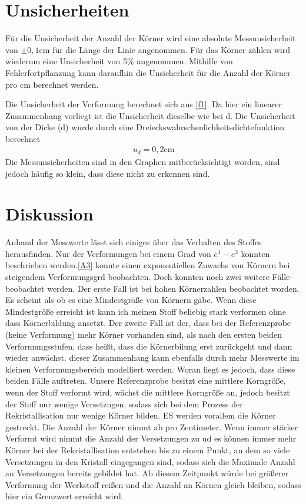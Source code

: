 \documentclass[
	a4paper,
	12pt,
	pagesize,
	ngerman
]{scrartcl}
\begin{document}
\section{Unsicherheiten}
Für die Unsicherheit der Anzahl der Körner wird eine absolute Messunsicherheit von $\pm 0,1$cm für die Länge der Linie angenommen. Für das Körner zählen wird wiederum eine Unsicherheit von 5\% angenommen. Mithilfe von Fehlerfortpflanzung kann daraufhin die Unsicherheit für die Anzahl der Körner pro cm berechnet werden.

Die Unsicherheit der Verformung berechnet sich aus \cref{f1}.
Da hier ein linearer Zusammenhang vorliegt ist die Unsicherheit dieselbe wie bei d. Die Unsicherheit von der Dicke (d) wurde durch eine Dreieckswahrschenlichkeitsdichtefunktion berechnet 
\begin{align*}
    u_d = 0,2\text{cm}
\end{align*}
Die Messunsicherheiten sind in den Graphen mitberücksichtigt worden, sind jedoch häufig so klein, dass diese nicht zu erkennen sind.


\section{Diskussion}
Anhand der Messwerte lässt sich einiges über das Verhalten des Stoffes herausfinden. Nur der Verformungen bei einem Grad von $e^1-e^3$ konnten beschrieben werden.\cref{A3} konnte einen exponentiellen Zuwachs von Körnern bei steigendem Verformungsgrd beobachten. Doch konnten noch zwei weitere Fälle beobachtet werden. Der erste Fall ist bei hohen Körnerzahlen beobachtet worden. Es scheint als ob es eine Mindestgröße von Körnern gäbe. Wenn diese Mindestgröße erreicht ist kann ich meinen Stoff beliebig stark verformen ohne dass Körnerbildung ansetzt. Der zweite Fall ist der, dass bei der Referenzprobe (keine Verformung) mehr Körner vorhanden sind, als nach den ersten beiden Verformungsstufen, dass heißt, dass die Körnerbilung erst zurückgeht und dann wieder anwächst. dieser Zusammenhang kann ebenfalls durch mehr Messwerte im kleinen Verformungsbereich modelliert werden. Woran liegt es jedoch, dass diese beiden Fälle auftreten. Unsere Referenzprobe besitzt eine mittlere Korngröße, wenn der Stoff verformt wird, wächst die mittlere Korngröße an, jedoch besitzt der Stoff nur wenige Versetzngen, sodass sich bei dem Prozess der Rekristallisation nur wenige Körner bilden. ES werden vorallem die Körner gestreckt. Die Anzahl der Körner nimmt ab pro Zentimeter. Wenn immer stärker Verformt wird nimmt die Anzahl der Versetzungen zu ud es können immer mehr Körner bei der Rekristallisation entstehen bis zu einem Punkt, an dem so viele Versetzungen in den Kristall eingegangen sind, sodass sich die Maximale Anzahl an Versetzungen bereits gebildet hat. Ab diesem Zeitpunkt würde bei größerer Verformung der Werkstoff reißen und die Anzahl an Körnen gleich bleiben, sodass hier ein Grenzwert erreicht wird.
\end{document}

